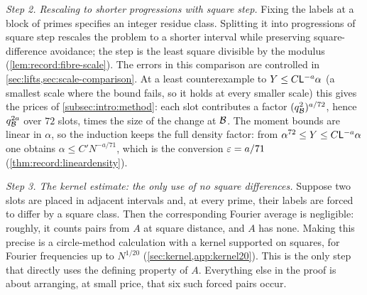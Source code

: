 \emph{Step 2. Rescaling to shorter progressions with square step.}
Fixing the labels at a block of primes specifies an integer residue
class. Splitting it into progressions of square step rescales the
problem to a shorter interval while preserving square-difference
avoidance; the step is the least square divisible by the modulus
(\cref{lem:record:fibre-scale}). The errors in this comparison are
controlled in \cref{sec:lifts,sec:scale-comparison}. At a least
counterexample to $Y\le C\mathsf L^{-a}\alpha$ (a smallest scale where
the bound fails, so it holds at every smaller scale) this gives the
prices of \cref{subsec:intro:method}: each slot contributes a factor
$(q_{\mathcal B}^2)^{a/72}$, hence $q_{\mathcal B}^{2a}$ over $72$ slots, times
the size of the change at $\mathcal B$. The moment bounds are linear in $\alpha$, so the
induction keeps the full density factor: from
$\alpha^{72}\le Y\le C\mathsf L^{-a}\alpha$ one obtains $\alpha\le C'N^{-a/71}$,
which is the conversion $\varepsilon=a/71$ (\cref{thm:record:lineardensity}).

\emph{Step 3. The kernel estimate: the only use of no square differences.}
Suppose two slots are placed in adjacent intervals and, at every
prime, their labels are forced to differ by a square class. Then the
corresponding Fourier average is negligible: roughly, it counts
pairs from $A$ at square distance, and $A$ has none. Making this
precise is a circle-method calculation with a kernel supported on
squares, for Fourier frequencies up to $N^{1/20}$
(\cref{sec:kernel,app:kernel20}). This is the only step that
directly uses the defining property of $A$. Everything else in the
proof is about arranging, at small price, that six such forced
pairs occur.

